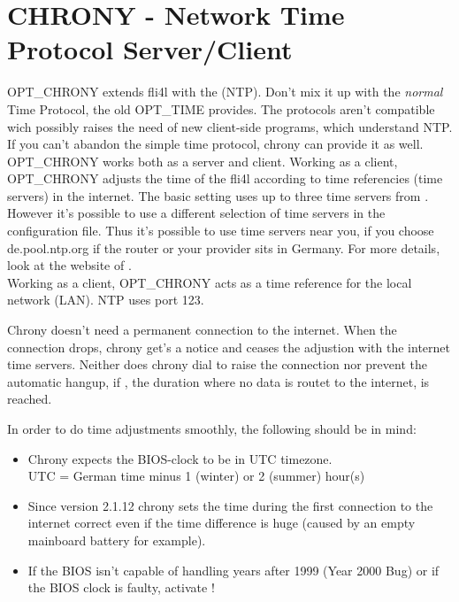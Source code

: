 
\section {CHRONY - Network Time Protocol Server/Client}

OPT\_CHRONY extends fli4l with the  (NTP). Don't mix it up with the \emph{normal} Time Protocol,
the old OPT\_TIME provides. The protocols aren't compatible wich possibly raises the need 
of new client-side programs, which understand NTP. If you can't abandon the
simple time protocol, chrony can provide it as well.
OPT\_CHRONY works both as a server and client. Working as a client, OPT\_CHRONY
adjusts the time of the fli4l according to time referencies (time servers) in
the internet. The basic setting uses up to three time servers from 
. However it's possible to use a different 
selection of time servers in the configuration file. Thus it's possible to use time servers
near you, if you choose de.pool.ntp.org if the router or your provider sits in Germany.
For more details, look at the website of .\\

Working as a client, OPT\_CHRONY acts as a time reference for the local network (LAN). 
NTP uses port 123.

Chrony doesn't need a permanent connection to the internet. When the connection drops,
chrony get's a notice and ceases the adjustion with the internet time servers. Neither 
does chrony dial to raise the connection nor prevent the automatic hangup, if
, the duration where no data is routet to the internet, is reached.

In order to do time adjustments smoothly, the following should be in mind:
\begin{itemize}
  \item Chrony expects the BIOS-clock to be in UTC timezone. \\
        UTC = German time minus 1 (winter) or 2 (summer) hour(s)
  \item Since version 2.1.12 chrony sets the time during the first connection
        to the internet correct even if the time difference is huge (caused by an 
	empty mainboard battery for example). 
  \item If the BIOS isn't capable of handling years after 1999 (Year 2000 Bug) or
        if the BIOS clock is faulty, activate !
\end{itemize}

